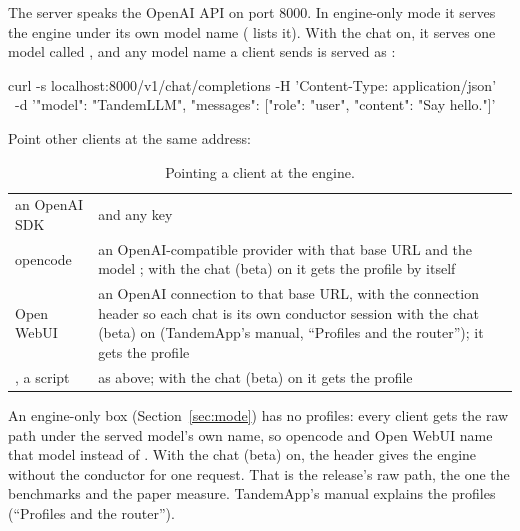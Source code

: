 The server speaks the OpenAI API on port 8000. In engine-only mode it serves the engine under its own model name ( lists it). With the chat on, it serves one model called , and any model name a client sends is served as :

\begin{shell}
curl -s localhost:8000/v1/chat/completions -H 'Content-Type: application/json' \
    -d '{"model": "TandemLLM", "messages": [{"role": "user", "content": "Say hello."}]}'
\end{shell}

Point other clients at the same address:

\begin{table}[htbp]
\centering\small
\caption{Pointing a client at the engine.}\label{tab:clients}
\begin{tabularx}{\linewidth}{@{}L{.2\linewidth}Y@{}}
\toprule
{} &  \\
\midrule
an OpenAI SDK &  and any key \\
opencode & an OpenAI-compatible provider with that base URL and the model ; with the chat (beta) on it gets the  profile by itself \\
Open WebUI & an OpenAI connection to that base URL, with the connection header \code{X-OpenWebUI-Chat-Id: {{CHAT_ID}}} so each chat is its own conductor session with the chat (beta) on (TandemApp's manual, \enquote{Profiles and the router}); it gets the  profile \\
\code{curl}, a script & as above; with the chat (beta) on it gets the \code{general} profile \\
\bottomrule
\end{tabularx}
\end{table}

An engine-only box (Section~\ref{sec:mode}) has no profiles: every client gets the raw path under the served model's own name, so opencode and Open WebUI name that model instead of . With the chat (beta) on, the header  gives the engine without the conductor for one request. That is the release's raw path, the one the benchmarks and the paper measure. TandemApp's manual explains the profiles (\enquote{Profiles and the router}).


